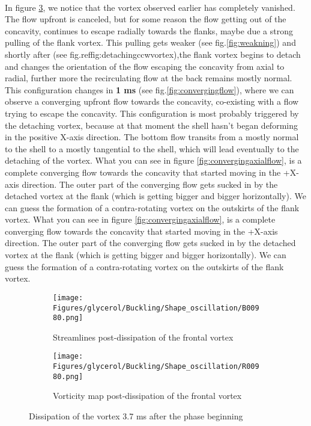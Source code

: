 \documentclass[a4paper,10pt]{report}
\begin{document}
\paragraph{}
In figure \ref{fig:dissipationmigrationVortex}, we notice that the vortex observed earlier has completely vanished. The flow upfront is canceled, but for some reason the flow getting out of the concavity, continues to escape radially towards the flanks, maybe due a strong pulling of the flank vortex.
This pulling gets weaker (see fig.\ref{fig:weakning}) and shortly after (see fig.ref{fig:detachingccwvortex}),the flank vortex begins to detach and changes the orientation of the flow escaping the concavity from axial to radial, further more the recirculating flow at the back remains mostly normal. This configuration changes in \textbf{1 ms}  (see fig.\ref{fig:convergingflow}), where we can observe a converging upfront flow towards the concavity, co-existing with a flow trying to escape the concavity. This configuration is most probably triggered by the detaching vortex, because at that moment the shell hasn't began deforming in the positive X-axis direction. The bottom flow transits from a mostly normal to the shell to a mostly tangential to the shell, which will lead  eventually to the detaching of the vortex.
What you can see in figure \ref{fig:convergingaxialflow}, is a complete converging flow towards the concavity that started moving in the +X-axis direction. The outer part of the converging flow gets sucked in by the detached vortex at the flank (which is getting bigger and bigger horizontally). We can guess the formation of a contra-rotating vortex on the outskirts of the flank vortex.
What you can see in figure \ref{fig:convergingaxialflow}, is a complete converging flow towards the concavity that started moving in the +X-axis direction. The outer part of the converging flow gets sucked in by the detached vortex at the flank (which is getting bigger and bigger horizontally). We can guess the formation of a contra-rotating vortex on the outskirts of the flank vortex.
\begin{figure}[htbp]%
	\centering%
		\begin{subfigure}[h]{0.5\textwidth}%
					\texttt{[image: Figures/glycerol/Buckling/Shape\_oscillation/B00980.png]}%
					\caption{Streamlines post-dissipation of the frontal vortex}%
					\label{fig:migrationVortexstream}%
			\end{subfigure}%
			\begin{subfigure}[h]{0.5\linewidth}%
					\texttt{[image: Figures/glycerol/Buckling/Shape\_oscillation/R00980.png]}%
					\caption{Vorticity map post-dissipation of the frontal vortex}%
					\label{fig:migrationVortexvorticity}%
			\end{subfigure}%
		\caption{Dissipation of the vortex 3.7 ms after the phase beginning}
		\label{fig:dissipationmigrationVortex}%
\end{figure}
\end{document}
